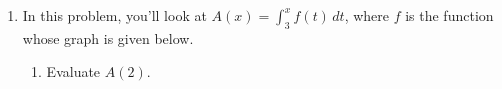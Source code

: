 \documentclass{article}
\begin{document}
\begin{enumerate}

\newpage

\item \label{spring2012-mb-midterm2-area-function}



  In this problem, you'll look at $ A(x) = \displaystyle \int_{3}^x
  f(t)\,dt$, where $f$ is the function whose graph is given below.


  \begin{enumerate}
  \item \label{spring2012-mb-midterm2-area-function-evaluate}

    \begin{problem}[\vfill]
      Evaluate $ A(2)$.
    \end{problem}    


\end{enumerate}
\end{enumerate}
\end{document}
